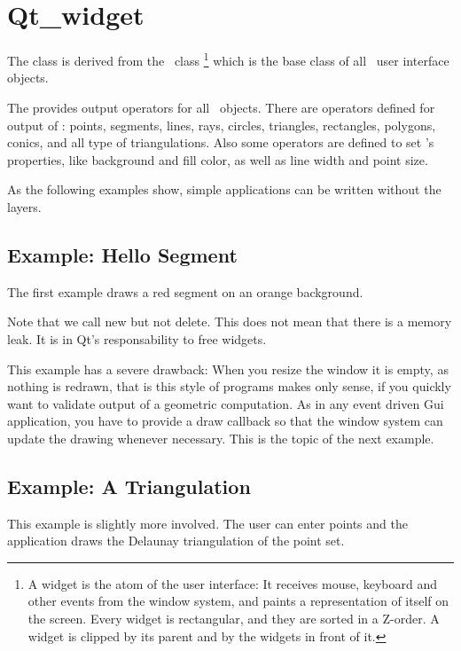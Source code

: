 \section{Qt\_widget}
\label{Qt_widget}

The class  is derived from the \qt\ class %
\footnote{A widget is the atom of the user interface: It receives mouse, keyboard and other 
events from the window system, and paints a representation of itself on the 
screen. Every widget is rectangular, and they are sorted in a Z-order. A 
widget is clipped by its parent and by the widgets in front of it.} 
which is the base class of all \qt\ user interface objects. 


The  provides output operators for all \cgal\
objects. There are operators defined for output of : points, segments, 
lines, rays, circles, triangles, rectangles, polygons, conics,  and all type of
triangulations. Also some operators are defined to set
's properties, like background and fill color, as
well as line width and point size.

As the following examples show, simple applications can be written
without the layers.

\subsection{Example: Hello Segment}
The first example draws a red segment on an orange background.

Note that we call new but not delete. This does not mean that there is 
a memory leak. It is in Qt's responsability to free widgets.

This example has a severe drawback: When you resize the window it is
empty, as nothing is redrawn, that is this style of programs makes
only sense, if you quickly want to validate output of a geometric
computation. As in any event driven {\sc Gui} application, you have to provide 
a draw callback so that the window system can update the drawing
whenever necessary. This is the topic of the next example.

\subsection{Example: A Triangulation}

This example is slightly more involved. The user can enter points and
the application draws the Delaunay triangulation of the point set. 

